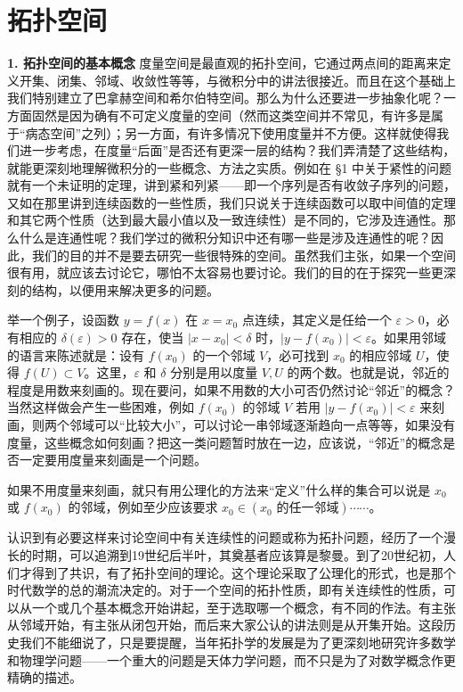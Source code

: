 \section{拓扑空间}

\noindent\textbf{1. 拓扑空间的基本概念}\quad
度量空间是最直观的拓扑空间，它通过两点间的距离来定义开集、闭集、邻域、收敛性等等，与微积分中的讲法很接近。而且在这个基础上我们特别建立了巴拿赫空间和希尔伯特空间。那么为什么还要进一步抽象化呢？一方面固然是因为确有不可定义度量的空间（然而这类空间并不常见，有许多是属于“病态空间”之列）；另一方面，有许多情况下使用度量并不方便。这样就使得我们进一步考虑，在度量“后面”是否还有更深一层的结构？我们弄清楚了这些结构，就能更深刻地理解微积分的一些概念、方法之实质。例如在 \S1 中关于紧性的问题就有一个未证明的定理，讲到紧和列紧——即一个序列是否有收敛子序列的问题，又如在那里讲到连续函数的一些性质，我们只说关于连续函数可以取中间值的定理和其它两个性质（达到最大最小值以及一致连续性）是不同的，它涉及连通性。那么什么是连通性呢？我们学过的微积分知识中还有哪一些是涉及连通性的呢？因此，我们的目的并不是要去研究一些很特殊的空间。虽然我们主张，如果一个空间很有用，就应该去讨论它，哪怕不太容易也要讨论。我们的目的在于探究一些更深刻的结构，以便用来解决更多的问题。

举一个例子，设函数 $y=f(x)$ 在 $x=x_0$ 点连续，其定义是任给一个 $\varepsilon>0$，必有相应的 $\delta(\varepsilon)>0$ 存在，使当 $|x-x_0|<\delta$ 时，$|y-f(x_0)|<\varepsilon$。如果用邻域的语言来陈述就是：设有 $f(x_0)$ 的一个邻域 $V$，必可找到 $x_0$ 的相应邻域 $U$，使得 $f(U)\subset V$。这里，$\varepsilon$ 和 $\delta$ 分别是用以度量 $V,U$ 的两个数。也就是说，邻近的程度是用数来刻画的。现在要问，如果不用数的大小可否仍然讨论“邻近”的概念？当然这样做会产生一些困难，例如 $f(x_0)$ 的邻域 $V$ 若用 $|y-f(x_0)|<\varepsilon$ 来刻画，则两个邻域可以“比较大小”，可以讨论一串邻域逐渐趋向一点等等，如果没有度量，这些概念如何刻画？把这一类问题暂时放在一边，应该说，“邻近”的概念是否一定要用度量来刻画是一个问题。

如果不用度量来刻画，就只有用公理化的方法来“定义”什么样的集合可以说是 $x_0$ 或 $f(x_0)$ 的邻域，例如至少应该要求 $x_0\in(x_0\text{ 的任一邻域})\cdots\cdots$。

认识到有必要这样来讨论空间中有关连续性的问题或称为拓扑问题，经历了一个漫长的时期，可以追溯到19世纪后半叶，其奠基者应该算是黎曼。到了20世纪初，人们才得到了共识，有了拓扑空间的理论。这个理论采取了公理化的形式，也是那个时代数学的总的潮流决定的。对于一个空间的拓扑性质，即有关连续性的性质，可以从一个或几个基本概念开始讲起，至于选取哪一个概念，有不同的作法。有主张从邻域开始，有主张从闭包开始，而后来大家公认的讲法则是从开集开始。这段历史我们不能细说了，只是要提醒，当年拓扑学的发展是为了更深刻地研究许多数学和物理学问题——一个重大的问题是天体力学问题，而不只是为了对数学概念作更精确的描述。

